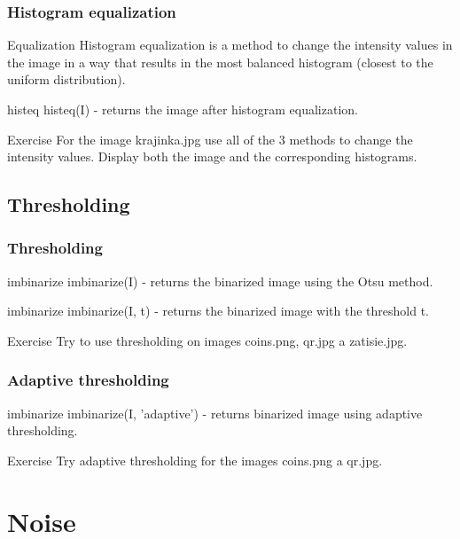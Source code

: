 \documentclass{beamer}
\begin{document}
\begin{frame}
\frametitle{Histogram equalization}
\begin{block}{Equalization}
Histogram equalization is a method to change the intensity values in the image in a way that results in the most balanced histogram (closest to the uniform distribution).
\end{block}

\begin{block}{histeq}
histeq(I) - returns the image after histogram equalization.
\end{block}

\begin{block}{Exercise}
For the image krajinka.jpg use all of the 3 methods to change the intensity values. Display both the image and the corresponding histograms.
\end{block}
\end{frame}

\subsection{Thresholding}
\begin{frame}
\frametitle{Thresholding}
\begin{block}{imbinarize}
imbinarize(I) - returns the binarized image using the Otsu method.
\end{block}

\begin{block}{imbinarize}
imbinarize(I, t) - returns the binarized image with the threshold t.
\end{block}

\begin{block}{Exercise}
Try to use thresholding on images coins.png, qr.jpg a zatisie.jpg.
\end{block}
\end{frame}

\begin{frame}
\frametitle{Adaptive thresholding}
\begin{block}{imbinarize}
imbinarize(I, 'adaptive') - returns binarized image using adaptive thresholding.
\end{block}

\begin{block}{Exercise}
Try adaptive thresholding for the images coins.png a qr.jpg.
\end{block}
\end{frame}


\section{Noise}
\end{document}
